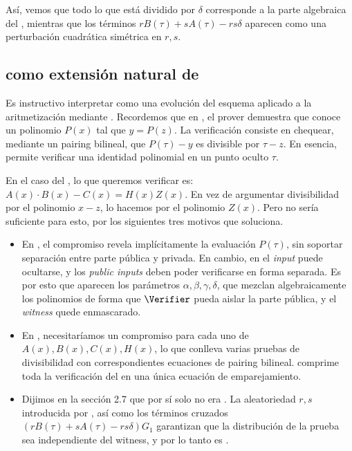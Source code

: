 Así, vemos que todo lo que está dividido por $\delta$ corresponde a la parte algebraica del \QAP, mientras que los términos $rB(\tau) + sA(\tau) - rs\delta$ aparecen como una perturbación cuadrática simétrica en $r, s$.


\subsection{\Groth como extensión natural de \KZG}

Es instructivo interpretar \Groth como una evolución del esquema \KZG aplicado a la aritmetización mediante \QAP. Recordemos que en \KZG, el prover demuestra que conoce un polinomio $P(x)$ tal que $y = P(z)$. La verificación consiste en chequear, mediante un pairing bilineal, que $P(\tau) - y$ es divisible por $\tau - z$. En esencia, \KZG permite verificar una identidad polinomial en un punto oculto $\tau$.

En el caso del \QAP, lo que queremos verificar es: $A(x) \cdot B(x) - C(x) = H(x) Z(x)$. En vez de argumentar divisibilidad por el polinomio $x - z$, lo hacemos por el polinomio $Z(x)$. Pero \KZG no sería suficiente para esto, por los siguientes tres motivos que \Groth soluciona.

\begin{itemize}[itemsep=0.1cm]
	\item En \KZG, el compromiso revela implícitamente la evaluación $P(\tau)$, sin soportar separación entre parte pública y privada. En cambio, en \Groth el \textit{input} puede ocultarse, y los \textit{public inputs} deben poder verificarse en forma separada. Es por esto que aparecen los parámetros $\alpha, \beta, \gamma, \delta$, que mezclan algebraicamente los polinomios de forma que $\Verifier$ pueda aislar la parte pública, y el \textit{witness} quede enmascarado.
	\item En \KZG, necesitaríamos un compromiso para cada uno de $A(x), B(x), C(x), H(x)$, lo que conlleva varias pruebas de divisibilidad con correspondientes ecuaciones de pairing bilineal. \Groth comprime toda la verificación del \QAP en una única ecuación de emparejamiento.
	\item Dijimos en la sección 2.7 que \KZG por sí solo no era \ZK. La aleatoriedad $r, s$ introducida por \Groth, así como los términos cruzados $(rB(\tau) + sA(\tau) - rs\delta)G_1$ garantizan que la distribución de la prueba sea independiente del witness, y por lo tanto es \ZK.
\end{itemize}

